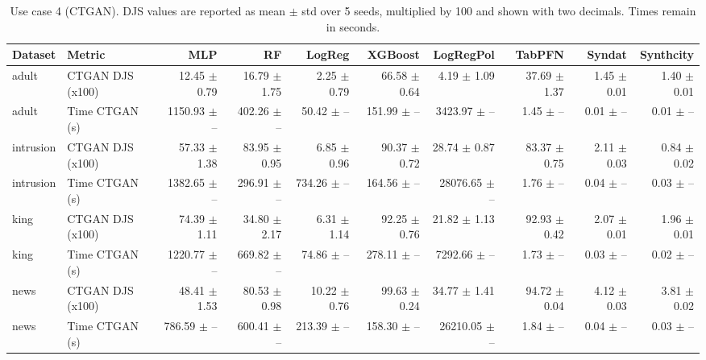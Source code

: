 \begin{table}[ht]
\centering
\scriptsize
\setlength{\tabcolsep}{2.5pt}
\caption{Use case 4 (CTGAN). DJS values are reported as mean $\pm$ std over 5 seeds, multiplied by 100 and shown with two decimals. Times remain in seconds.}
\label{tab:uc4_ctgan_by_classifier_mean_std_x100_2dec}
\begin{tabular}{llrrrrrrrr}
\toprule
Dataset & Metric & MLP & RF & LogReg & XGBoost & LogRegPol & TabPFN & Syndat & Synthcity \\
\midrule
adult & CTGAN DJS (x100) & 12.45 $\pm$ 0.79 & 16.79 $\pm$ 1.75 & 2.25 $\pm$ 0.79 & 66.58 $\pm$ 0.64 & 4.19 $\pm$ 1.09 & 37.69 $\pm$ 1.37 & 1.45 $\pm$ 0.01 & 1.40 $\pm$ 0.01 \\
adult & Time CTGAN (s) & 1150.93 $\pm$ -- & 402.26 $\pm$ -- & 50.42 $\pm$ -- & 151.99 $\pm$ -- & 3423.97 $\pm$ -- & 1.45 $\pm$ -- & 0.01 $\pm$ -- & 0.01 $\pm$ -- \\
intrusion & CTGAN DJS (x100) & 57.33 $\pm$ 1.38 & 83.95 $\pm$ 0.95 & 6.85 $\pm$ 0.96 & 90.37 $\pm$ 0.72 & 28.74 $\pm$ 0.87 & 83.37 $\pm$ 0.75 & 2.11 $\pm$ 0.03 & 0.84 $\pm$ 0.02 \\
intrusion & Time CTGAN (s) & 1382.65 $\pm$ -- & 296.91 $\pm$ -- & 734.26 $\pm$ -- & 164.56 $\pm$ -- & 28076.65 $\pm$ -- & 1.76 $\pm$ -- & 0.04 $\pm$ -- & 0.03 $\pm$ -- \\
king & CTGAN DJS (x100) & 74.39 $\pm$ 1.11 & 34.80 $\pm$ 2.17 & 6.31 $\pm$ 1.14 & 92.25 $\pm$ 0.76 & 21.82 $\pm$ 1.13 & 92.93 $\pm$ 0.42 & 2.07 $\pm$ 0.01 & 1.96 $\pm$ 0.01 \\
king & Time CTGAN (s) & 1220.77 $\pm$ -- & 669.82 $\pm$ -- & 74.86 $\pm$ -- & 278.11 $\pm$ -- & 7292.66 $\pm$ -- & 1.73 $\pm$ -- & 0.03 $\pm$ -- & 0.02 $\pm$ -- \\
news & CTGAN DJS (x100) & 48.41 $\pm$ 1.53 & 80.53 $\pm$ 0.98 & 10.22 $\pm$ 0.76 & 99.63 $\pm$ 0.24 & 34.77 $\pm$ 1.41 & 94.72 $\pm$ 0.04 & 4.12 $\pm$ 0.03 & 3.81 $\pm$ 0.02 \\
news & Time CTGAN (s) & 786.59 $\pm$ -- & 600.41 $\pm$ -- & 213.39 $\pm$ -- & 158.30 $\pm$ -- & 26210.05 $\pm$ -- & 1.84 $\pm$ -- & 0.04 $\pm$ -- & 0.03 $\pm$ -- \\
\bottomrule
\end{tabular}
\end{table}